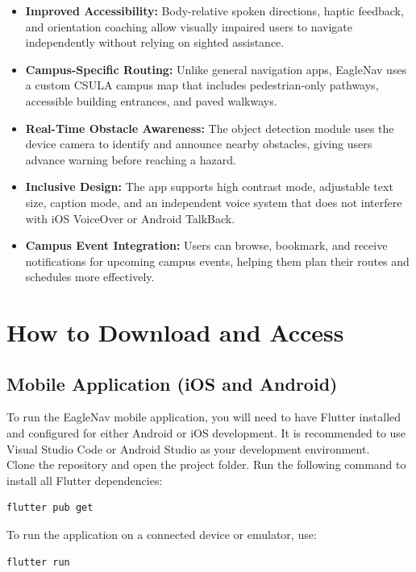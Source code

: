 \documentclass[12pt]{article}
\begin{document}
\begin{itemize}
    \item \textbf{Improved Accessibility:} Body-relative spoken directions, haptic feedback, and orientation coaching allow visually impaired users to navigate independently without relying on sighted assistance.
    \item \textbf{Campus-Specific Routing:} Unlike general navigation apps, EagleNav uses a custom CSULA campus map that includes pedestrian-only pathways, accessible building entrances, and paved walkways.
    \item \textbf{Real-Time Obstacle Awareness:} The object detection module uses the device camera to identify and announce nearby obstacles, giving users advance warning before reaching a hazard.
    \item \textbf{Inclusive Design:} The app supports high contrast mode, adjustable text size, caption mode, and an independent voice system that does not interfere with iOS VoiceOver or Android TalkBack.
    \item \textbf{Campus Event Integration:} Users can browse, bookmark, and receive notifications for upcoming campus events, helping them plan their routes and schedules more effectively.
\end{itemize}

\newpage

\section*{How to Download and Access}

\subsection*{Mobile Application (iOS and Android)}

To run the EagleNav mobile application, you will need to have Flutter installed and configured for either Android or iOS development. It is recommended to use Visual Studio Code or Android Studio as your development environment. \\

\noindent Clone the repository and open the project folder. Run the following command to install all Flutter dependencies:
\begin{verbatim}
flutter pub get
\end{verbatim}

\noindent To run the application on a connected device or emulator, use:
\begin{verbatim}
flutter run
\end{verbatim}
\end{document}
